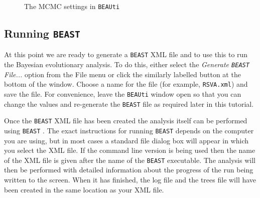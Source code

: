 \documentclass[cup7b, english]{cupbook}
\begin{document}
\begin{figure}[htbp]
\begin{center}
\leavevmode
{}
\end{center}
\caption{The MCMC settings in \texttt{BEAUti}}
\label{fig:figure4}
\end{figure}

\subsection{Running \texttt{BEAST}}

At this point we are ready to generate a \texttt{BEAST} XML file and to use this to run the Bayesian
evolutionary analysis. To do this, either select the {\it Generate \texttt{BEAST} File...} option
from the File menu or click the similarly labelled button at the bottom of the window.
Choose a name for the file (for example, \texttt{RSVA.xml}) and save the file. For
convenience, leave the \texttt{BEAUti} window open so that you can change the values and re-generate
the \texttt{BEAST} file as required later in this tutorial.

Once the \texttt{BEAST} XML file has been created the analysis itself can be performed using \texttt{BEAST} . 
The exact instructions for running \texttt{BEAST} depends on the computer you are using, but in most 
cases a standard file dialog box will appear in which you select the XML file. If the command line version is being
used then the name of the XML file is given after the name of the \texttt{BEAST} executable. The analysis will
then be performed with detailed information about the progress of the run being written to the screen. When it
has finished, the log file and the trees file will have been created in the same location as your XML file.
\end{document}

